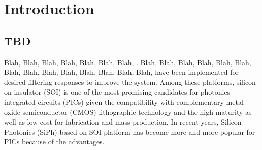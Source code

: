 
\chapter{Introduction}\label{chap:1}

\section{TBD} \label{sec:1.1}
    Blah, Blah, Blah, Blah, Blah, Blah, Blah, \cite{kashyap-fbg, smit-awg-review}. 
    Blah, Blah, Blah, Blah, Blah, Blah, Blah, Blah, Blah, Blah, Blah, Blah, Blah, Blah, \cite{smit-awg-review, smit-1stawg, flat-awg-mmi-1, flat-awg-mmi-2, flat-awg-mmi-3, flat-awg-mmi-4, flat-awg-mmi-5, flat-awg-mmi-6, cwdmf-awg-2, flat-awg-horn-1, flat-awg-horn-2, flat-awg-horn-3, flat-awg-sinc-1, flat-awg-sinc-2, flat-awg-sinc-3, flat-awg-sinc-4, flat-awg-sinc-5, wdmf-awg-1, wdmf-awg-2, wdmf-awg-3, wdmf-awg-4, wdmf-awg-5, wdmf-awg-6, wdmf-awg-7, wdmf-eg-1, wdmf-immi, wdmf-mmwg-1, wdmf-all-1, wdmf-wbg-1, wdmf-wbg-2, wdmf-wbg-3, wdmf-ringamzi-1, cwdmf-mmi-1, cwdmf-mmi-2, cwdmf-mmi-3, cwdmf-eg-1, cwdmf-eg-2, cwdmf-eg-3, cwdmf-wbg-1, cwdmf-wbg-2, cwdmf-wbg-3, cwdmf-wbg-4, cwdmf-wbg-5, cwdmf-wbg-6, cwdmf-awgmzi-1, cwdmf-awgmzi-2, cwdmf-awg-1, cwdmf-awg-2, cwdmf-awg-3, cwdmf-awg-4, cwdmf-awg-5, cwdmf-mzi-1, cwdmf-mzi-2, cwdmf-mzi-3, cwdmf-mzi-4, cwdmf-mzi-5, cwdmf-mzi-6, cwdmf-mzi-7, cwdmf-mzi-8, cwdmf-mzi-9, cwdmf-all} 
    have been implemented for desired filtering responses to improve the system. 
    Among these platforms, silicon-on-insulator (SOI) is one of the most promising 
    candidates for photonics integrated circuits (PICs) given the compatibility with complementary metal-oxide-semiconductor (CMOS) 
    lithographic technology and the high maturity as well as low cost for fabrication and mass production. 
    In recent years, 
    Silicon Photonics (SiPh) based on SOI platform has become more and more popular for PICs \cite{hqp-1, icl-2, mdm-2, cwdmf-eg-3, cwdmf-wbg-1, picp-10, adc-1, mdm-1, wdmf-mmwg-1, wdmf-all-1, psr-1, psr-5, mzm-2, mzm-1, pbs-1, pbs-2, pbs-3, psr-2, psr-3, psr-4, wbg-1, wbg-3, cwdmf-mmi-2, cwdmf-all, cwdmf-wbg-2, fec-1, fec-2, fgc-2, wdmf-wbg-3, wdmf-eg-1, flat-awg-mmi-5, wdmf-awg-5, flat-awg-mmi-4, wdmf-awg-1, wdmf-awg-2, cwdmf-eg-1, cwdmf-eg-2, cwdmf-mzi-1, cwdmf-mzi-2, cwdmf-mzi-4, cwdmf-mzi-6, cwdmf-wbg-4, wdmf-awg-4, wdmf-awg-3, TTAWG-p1, TTAWG-p3, flat-awg-sinc-2, awg-fig-3} because of the advantages. 
    
